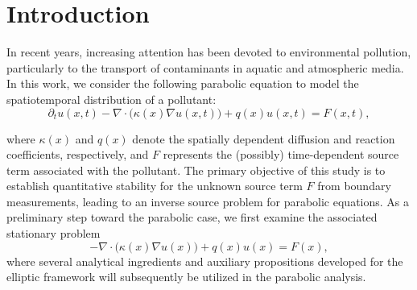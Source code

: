 \documentclass[12pt]{amsart}
\begin{document}
\section{Introduction}

In recent years, increasing attention has been devoted to environmental pollution, particularly to the transport of contaminants in aquatic and atmospheric media. In this work, we consider the following parabolic equation to model the spatiotemporal distribution of a pollutant:
\begin{equation*}
    \partial_t u(x,t) - \nabla \cdot\Big(\kappa(x) \nabla u(x,t)\Big) + q(x) u(x,t)= F(x,t),
\end{equation*}


where $\kappa(x)$ and $q(x)$ denote the spatially dependent diffusion and reaction coefficients, respectively, and $F$ represents the (possibly) time-dependent source term associated with the pollutant. The primary objective of this study is to establish quantitative stability for the unknown source term $F$ from boundary measurements, leading to an inverse source problem for parabolic equations. As a preliminary step toward the parabolic case, we first examine the associated stationary problem
\begin{equation*}
     - \nabla \cdot\Big(\kappa(x) \nabla u(x)\Big) + q(x) u(x)= F(x),
\end{equation*}
where several analytical ingredients and auxiliary propositions developed for the elliptic framework will subsequently be utilized in the parabolic analysis.
\end{document}
